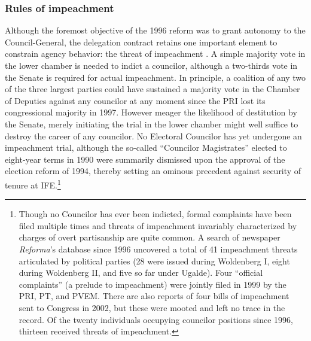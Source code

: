 \documentclass[12 pt, letter]{article}
\begin{document}
\subsubsection{Rules of impeachment}
Although the foremost objective of the 1996 reform was to grant autonomy to the Council-General, the delegation contract retains one important element to constrain agency behavior: the threat of impeachment \citep{Eisenstadt2004}.  A simple majority vote in the lower chamber is needed to indict a councilor, although a two-thirds vote in the Senate is required for actual impeachment.  In principle, a coalition of any two of the three largest parties could have sustained a majority vote in the Chamber of Deputies against any councilor at any moment since the PRI lost its congressional majority in 1997.  However meager the likelihood of destitution by the Senate, merely initiating the trial in the lower chamber might well suffice to destroy the career of any councilor.  No Electoral Councilor has yet undergone an impeachment trial, although the so-called ``Councilor Magistrates'' elected to eight-year terms in 1990 were summarily dismissed upon the approval of the election reform of 1994, thereby setting an ominous precedent against security of tenure at IFE.\footnote{Though no Councilor has ever been indicted, formal complaints have been filed multiple times and threats of impeachment invariably characterized by charges of overt partisanship are quite common. A search of newspaper \emph{Reforma}'s database since 1996 uncovered a total of 41 impeachment threats articulated by political parties (28 were issued during Woldenberg I, eight during Woldenberg II, and five so far under Ugalde).  Four ``official complaints'' (a prelude to impeachment) were jointly filed in 1999 by the PRI, PT, and PVEM.  There are also reports of four bills of impeachment sent to Congress in 2002, but these were mooted and left no trace in the record.  Of the twenty individuals occupying councilor positions since 1996, thirteen received threats of impeachment.} 
\end{document}
